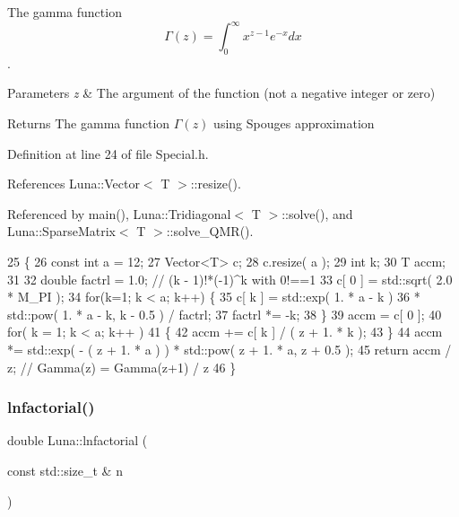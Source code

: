 The gamma function \[ \Gamma(z) = \int_0^{\infty} x^{z-1}e^{-x} dx \]. 


\begin{DoxyParams}{Parameters}
{\em z} & The argument of the function (not a negative integer or zero) \\
\hline
\end{DoxyParams}
\begin{DoxyReturn}{Returns}
The gamma function $\Gamma(z)$ using Spouge\textquotesingle{}s approximation 
\end{DoxyReturn}


Definition at line 24 of file Special.\+h.



References Luna\+::\+Vector$<$ T $>$\+::resize().



Referenced by main(), Luna\+::\+Tridiagonal$<$ T $>$\+::solve(), and Luna\+::\+Sparse\+Matrix$<$ T $>$\+::solve\+\_\+\+Q\+M\+R().


\begin{DoxyCode}
25     \{
26       \textcolor{keyword}{const} \textcolor{keywordtype}{int} a = 12;
27       Vector<T> c;
28       c.resize( a );
29       \textcolor{keywordtype}{int} k;
30       T accm;
31 
32       \textcolor{keywordtype}{double} factrl = 1.0; \textcolor{comment}{// (k - 1)!*(-1)^k with 0!==1}
33       c[ 0 ] = std::sqrt( 2.0 * M\_PI );
34       \textcolor{keywordflow}{for}(k=1; k < a; k++) \{
35         c[ k ] =    std::exp( 1. * a - k )
36                   * std::pow( 1. * a - k, k - 0.5 ) / factrl;
37         factrl *= -k;
38       \}
39       accm = c[ 0 ];
40       \textcolor{keywordflow}{for}( k = 1; k < a; k++ )
41       \{
42         accm += c[ k ] / ( z + 1. * k );
43       \}
44       accm *= std::exp( - ( z + 1. * a ) ) * std::pow( z + 1. * a, z + 0.5 );
45       \textcolor{keywordflow}{return} accm / z; \textcolor{comment}{// Gamma(z) = Gamma(z+1) / z}
46     \}
\end{DoxyCode}
\mbox{\label{namespaceLuna_af55fcfd16fe0fd817853f43623de1ea5}} 
\subsubsection{\texorpdfstring{lnfactorial()}{lnfactorial()}}
{\footnotesize\ttfamily double Luna\+::lnfactorial (\begin{DoxyParamCaption}\item[{const std\+::size\+\_\+t \&}]{n }\end{DoxyParamCaption})}



